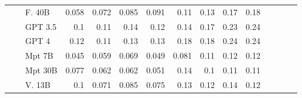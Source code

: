 \begin{table}[!htbp]
\begin{tabular}{l|l|l|rrrr|rrrr|rrrr}
 &  & F. 40B  & {\cellcolor[HTML]{B9D6EA}} \color[HTML]{000000} 0.058 & {\cellcolor[HTML]{99C7E0}} \color[HTML]{000000} 0.072 & {\cellcolor[HTML]{75B4D8}} \color[HTML]{000000} 0.085 & {\cellcolor[HTML]{66ABD4}} \color[HTML]{F1F1F1} 0.091  & {\cellcolor[HTML]{FCAB8F}} \color[HTML]{000000} 0.11 & {\cellcolor[HTML]{FC9474}} \color[HTML]{000000} 0.13 & {\cellcolor[HTML]{F96044}} \color[HTML]{F1F1F1} 0.17 & {\cellcolor[HTML]{F44D38}} \color[HTML]{F1F1F1} 0.18 \\  
 &  & GPT 3.5  & {\cellcolor[HTML]{4F9BCB}} \color[HTML]{F1F1F1} 0.1 & {\cellcolor[HTML]{3E8EC4}} \color[HTML]{F1F1F1} 0.11 & {\cellcolor[HTML]{125EA6}} \color[HTML]{F1F1F1} 0.14 & {\cellcolor[HTML]{3181BD}} \color[HTML]{F1F1F1} 0.12  & {\cellcolor[HTML]{FC7F5F}} \color[HTML]{F1F1F1} 0.14 & {\cellcolor[HTML]{F96245}} \color[HTML]{F1F1F1} 0.17 & {\cellcolor[HTML]{C9181D}} \color[HTML]{F1F1F1} 0.23 & {\cellcolor[HTML]{BC141A}} \color[HTML]{F1F1F1} 0.24 \\  
 &  & GPT 4   & {\cellcolor[HTML]{2C7CBA}} \color[HTML]{F1F1F1} 0.12 & {\cellcolor[HTML]{4896C8}} \color[HTML]{F1F1F1} 0.11 & {\cellcolor[HTML]{2070B4}} \color[HTML]{F1F1F1} 0.13 & {\cellcolor[HTML]{1C6BB0}} \color[HTML]{F1F1F1} 0.13  & {\cellcolor[HTML]{F24734}} \color[HTML]{F1F1F1} 0.18 & {\cellcolor[HTML]{F44F39}} \color[HTML]{F1F1F1} 0.18 & {\cellcolor[HTML]{B81419}} \color[HTML]{F1F1F1} 0.24 & {\cellcolor[HTML]{B31218}} \color[HTML]{F1F1F1} 0.24 \\  
 &  & Mpt 7B  & {\cellcolor[HTML]{D0E1F2}} \color[HTML]{000000} 0.045 & {\cellcolor[HTML]{B5D4E9}} \color[HTML]{000000} 0.059 & {\cellcolor[HTML]{A1CBE2}} \color[HTML]{000000} 0.069 & {\cellcolor[HTML]{CADDF0}} \color[HTML]{000000} 0.049  & {\cellcolor[HTML]{FDCBB6}} \color[HTML]{000000} 0.081 & {\cellcolor[HTML]{FCA98C}} \color[HTML]{000000} 0.11 & {\cellcolor[HTML]{FCA082}} \color[HTML]{000000} 0.12 & {\cellcolor[HTML]{FC9D7F}} \color[HTML]{000000} 0.12 \\  
 &  & Mpt 30B  & {\cellcolor[HTML]{8CC0DD}} \color[HTML]{000000} 0.077 & {\cellcolor[HTML]{B0D2E7}} \color[HTML]{000000} 0.062 & {\cellcolor[HTML]{B0D2E7}} \color[HTML]{000000} 0.062 & {\cellcolor[HTML]{C7DCEF}} \color[HTML]{000000} 0.051 &  {\cellcolor[HTML]{FC8161}} \color[HTML]{F1F1F1} 0.14 & {\cellcolor[HTML]{FCAF93}} \color[HTML]{000000} 0.1 & {\cellcolor[HTML]{FCA588}} \color[HTML]{000000} 0.11 & {\cellcolor[HTML]{FCAE92}} \color[HTML]{000000} 0.11 \\  
 &  & V. 13B  & {\cellcolor[HTML]{4896C8}} \color[HTML]{F1F1F1} 0.1 & {\cellcolor[HTML]{9CC9E1}} \color[HTML]{000000} 0.071 & {\cellcolor[HTML]{77B5D9}} \color[HTML]{000000} 0.085 & {\cellcolor[HTML]{91C3DE}} \color[HTML]{000000} 0.075 &  {\cellcolor[HTML]{FC8B6B}} \color[HTML]{F1F1F1} 0.13 & {\cellcolor[HTML]{FC9879}} \color[HTML]{000000} 0.12 & {\cellcolor[HTML]{FC8262}} \color[HTML]{F1F1F1} 0.14 & {\cellcolor[HTML]{FC9C7D}} \color[HTML]{000000} 0.12 \\  

\end{tabular}
\end{table}
